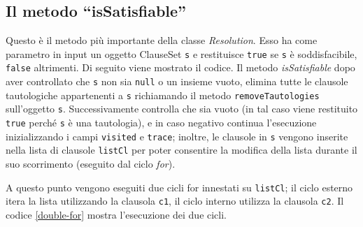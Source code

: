 \documentclass[a4paper,12pt]{report}
\begin{document}
\subsection{Il metodo ``isSatisfiable''}
\label{isSat}
Questo è il metodo più importante della classe \emph{Resolution}. Esso ha come parametro in input un oggetto ClauseSet \texttt{s} e restituisce \texttt{true} se \texttt{s} è soddisfacibile, \texttt{false} altrimenti. Di seguito viene mostrato il codice. Il metodo \emph{isSatisfiable} dopo aver controllato che \texttt{s} non sia \texttt{null} o un insieme vuoto, elimina tutte le clausole tautologiche appartenenti a \texttt{s} richiamando il metodo \texttt{removeTautologies} sull'oggetto \texttt{s}. Successivamente controlla che sia vuoto (in tal caso viene restituito \texttt{true} perché \texttt{s} è una tautologia), e in caso negativo continua l'esecuzione inizializzando i campi \texttt{visited} e \texttt{trace}; inoltre, le clausole in \texttt{s} vengono inserite nella lista di clausole \texttt{listCl} per poter consentire la modifica della lista durante il suo scorrimento (eseguito dal ciclo \emph{for}). 

A questo punto vengono eseguiti due cicli for innestati su \texttt{listCl}; il ciclo esterno itera la lista utilizzando la clausola \texttt{c1}, il ciclo interno utilizza la clausola \texttt{c2}. Il codice \ref{double-for} mostra l'esecuzione dei due cicli. 

    
\end{document}
